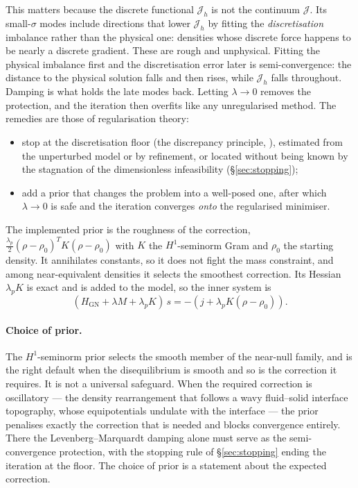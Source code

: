 \documentclass[11pt]{article}
\newcommand{\Jf}{\mathscr{J}}  %
\begin{document}
This matters because the discrete functional $\Jf _h$ is not the continuum
$\Jf $. Its small-$\sigma$ modes include directions that lower $\Jf _h$ by
fitting the \emph{discretisation} imbalance rather than the physical one:
densities whose discrete force happens to be nearly a discrete gradient.
These are rough and unphysical. Fitting the physical imbalance first and
the discretisation error later is semi-convergence: the distance to the
physical solution falls and then rises, while $\Jf _h$ falls throughout.
Damping is what holds the late modes back. Letting $\lambda\to0$ removes
the protection, and the iteration then overfits like any unregularised
method. The remedies are those of regularisation theory:
\begin{itemize}
\item stop at the discretisation floor (the discrepancy principle,
  \cite{EnglHankeNeubauer}), estimated from the unperturbed model or by
  refinement, or located without being known by the stagnation of the
  dimensionless infeasibility (\S\ref{sec:stopping});
\item add a prior that changes the problem into a well-posed one, after
  which $\lambda\to0$ is safe and the iteration converges \emph{onto} the
  regularised minimiser.
\end{itemize}
The implemented prior is the roughness of the correction,
$\tfrac{\lambda_p}2(\rho - \rho_0)^{T}K(\rho - \rho_0)$ with $K$ the
$H^1$-seminorm Gram and $\rho_0$ the starting density. It annihilates
constants, so it does not fight the mass constraint, and among
near-equivalent densities it selects the smoothest correction. Its Hessian
$\lambda_pK$ is exact and is added to the model, so the inner system is
\begin{equation}
  (H_{\mathrm{GN}} + \lambda M + \lambda_p K)\,s = -(j + \lambda_pK(\rho - \rho_0)) .
\end{equation}

\paragraph{Choice of prior.} The $H^1$-seminorm prior selects the smooth
member of the near-null family, and is the right default when the
disequilibrium is smooth and so is the correction it requires. It is not
a universal safeguard. When the required correction is oscillatory ---
the density rearrangement that follows a wavy fluid--solid interface
topography, whose equipotentials undulate with the interface --- the
prior penalises exactly the correction that is needed and blocks
convergence entirely. There the Levenberg--Marquardt damping alone must
serve as the semi-convergence protection, with the stopping rule of
\S\ref{sec:stopping} ending the iteration at the floor. The choice of
prior is a statement about the expected correction.
\end{document}
